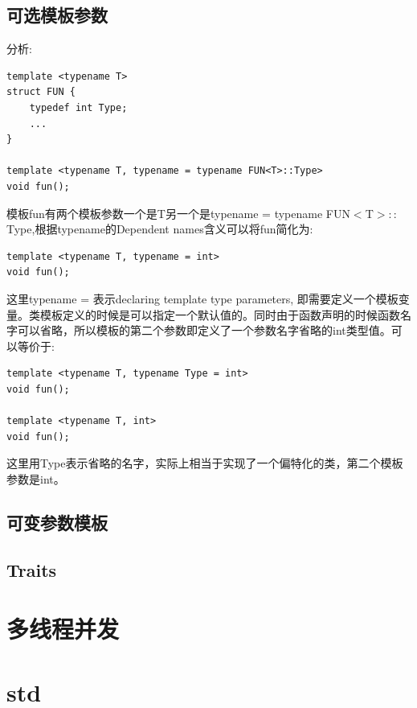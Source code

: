 \documentclass[12pt]{book}
\begin{document}
\subsection{可选模板参数}
分析:
\begin{lstlisting}
template <typename T>
struct FUN {
	typedef int Type;
	...
}

template <typename T, typename = typename FUN<T>::Type>
void fun();
\end{lstlisting}
模板fun有两个模板参数一个是T另一个是typename = typename FUN$<$T$>::$Type,根据typename的Dependent names含义可以将fun简化为:
\begin{lstlisting}
template <typename T, typename = int>
void fun();
\end{lstlisting}
这里typename = 表示declaring template type parameters, 即需要定义一个模板变量。类模板定义的时候是可以指定一个默认值的。同时由于函数声明的时候函数名字可以省略，所以模板的第二个参数即定义了一个参数名字省略的int类型值。可以等价于:
\begin{lstlisting}
template <typename T, typename Type = int>
void fun();
	
template <typename T, int>
void fun();
\end{lstlisting}
这里用Type表示省略的名字，实际上相当于实现了一个偏特化的类，第二个模板参数是int。

\subsection{可变参数模板}
\subsection{Traits}

\section{多线程并发}

\section{std}
\end{document}
